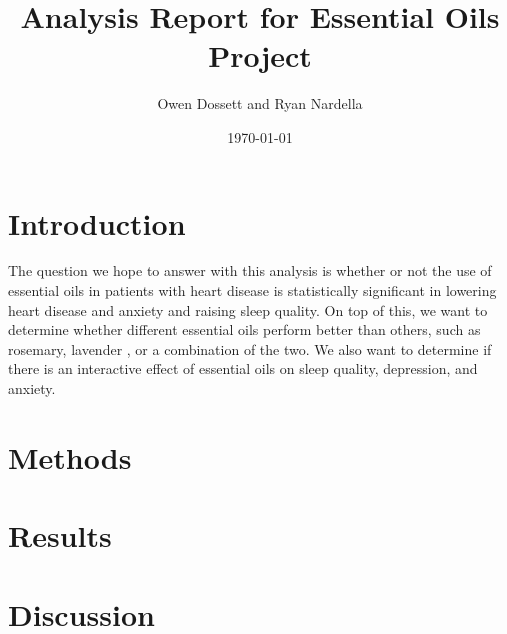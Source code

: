 \documentclass{article}
\title{Analysis Report for Essential Oils Project}
\author{Owen Dossett and Ryan Nardella}
\date{\today}
\begin{document}
\maketitle
\tableofcontents
\newpage


\section{Introduction}
The question we hope to answer with this analysis is
whether or not the use of essential oils in patients
with heart disease is statistically significant in lowering heart disease
and anxiety and raising sleep quality. On top of
this, we want to determine whether different essential oils
perform better than others, such as rosemary, lavender
, or a combination of the two. We also
want to determine if there is an interactive effect of
essential oils on sleep quality, depression, and anxiety.

\section{Methods}

\section{Results}

\section{Discussion}
\end{document}
